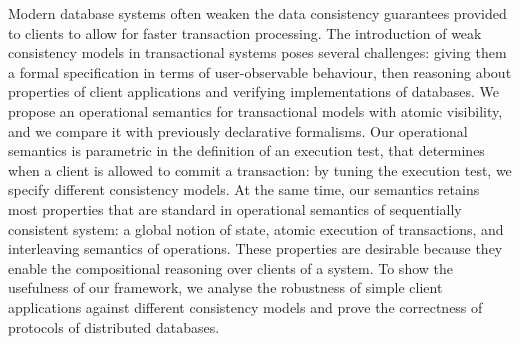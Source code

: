 %
Modern database systems often weaken the data consistency guarantees 
provided to clients to allow for faster transaction processing. 
The introduction of weak consistency models in transactional systems 
poses several challenges: giving them a formal specification in terms 
of user-observable behaviour, then reasoning about properties of client applications 
and verifying implementations of databases.
We propose an operational semantics for transactional models with  
atomic visibility, and we compare it with previously declarative formalisms. 
Our operational semantics is parametric in the definition of an execution test, 
that determines when a client is allowed to commit a transaction: 
by tuning the execution test, 
we specify different consistency models. 
At the same time, our semantics retains most properties 
that are standard in operational semantics of sequentially consistent system: 
a global notion of state, atomic execution of transactions, and interleaving 
semantics of operations. These properties are desirable because they enable 
the compositional reasoning over clients of a system.
To show the usefulness of our framework, 
we analyse the robustness of simple client applications 
against different consistency models and prove the correctness 
of protocols of distributed databases.




